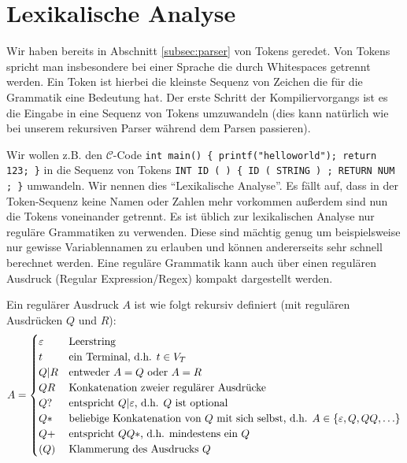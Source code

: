 \section{Lexikalische Analyse}
Wir haben bereits in Abschnitt \ref{subsec:parser} von Tokens geredet. Von Tokens spricht man insbesondere bei einer Sprache die durch Whitespaces getrennt werden. Ein Token ist hierbei die kleinste Sequenz von Zeichen die für die Grammatik eine Bedeutung hat.
Der erste Schritt der Kompiliervorgangs ist es die Eingabe in eine Sequenz von Tokens umzuwandeln (dies kann natürlich wie bei unserem rekursiven Parser während dem Parsen passieren).

Wir wollen z.B. den $\mathcal{C}$-Code \verb|int main() { printf("helloworld"); return 123; }| in die Sequenz von Tokens \verb|INT ID ( ) { ID ( STRING ) ; RETURN NUM ; }| umwandeln. Wir nennen dies ``Lexikalische Analyse''. Es fällt auf, dass in der Token-Sequenz keine Namen oder Zahlen mehr vorkommen außerdem sind nun die Tokens
voneinander getrennt.
Es ist üblich zur lexikalischen Analyse nur reguläre Grammatiken zu verwenden. Diese sind mächtig genug um beispielsweise nur gewisse Variablennamen zu erlauben
und können andererseits sehr schnell berechnet werden.
Eine reguläre Grammatik kann auch über einen regulären Ausdruck (Regular Expression/Regex) kompakt dargestellt werden.

\begin{defn}
Ein regulärer Ausdruck $A$ ist wie folgt rekursiv definiert (mit regulären Ausdrücken $Q$ und $R$):
\[A = \begin{cases}
\varepsilon & \text{Leerstring} \\
t & \text{ein Terminal, d.h. $t \in V_T$} \\
Q|R & \text{entweder $A=Q$ oder $A=R$} \\
QR & \text{Konkatenation zweier regulärer Ausdrücke} \\
Q? & \text{entspricht $Q|\varepsilon$, d.h. $Q$ ist optional} \\
Q* & \text{beliebige Konkatenation von $Q$ mit sich selbst, d.h. $A \in \left\{\varepsilon,Q,QQ,\ldots\right\}$} \\
Q+ & \text{entspricht $QQ*$, d.h. mindestens ein $Q$} \\
(Q) & \text{Klammerung des Ausdrucks $Q$}
\end{cases}\]
\end{defn}

